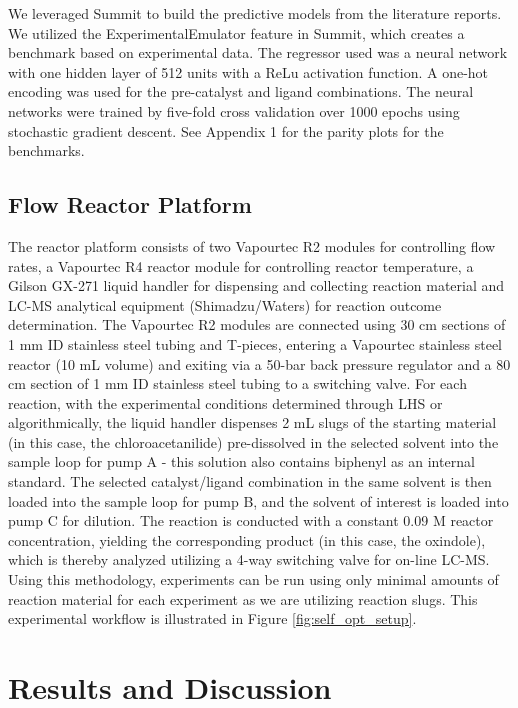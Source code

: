 We leveraged Summit to build the predictive models from the literature reports. We utilized the ExperimentalEmulator feature in Summit, which creates a benchmark based on experimental data. The regressor used was a neural network with one hidden layer of 512 units with a ReLu activation function. A one-hot encoding was used for the pre-catalyst and ligand combinations. The neural networks were trained by five-fold cross validation over 1000 epochs using stochastic gradient descent. See Appendix 1 for the parity plots for the benchmarks. 

\subsection{Flow Reactor Platform}

The reactor platform consists of two Vapourtec R2 modules for controlling flow rates, a Vapourtec R4 reactor module for controlling reactor temperature, a Gilson GX-271 liquid handler for dispensing and collecting reaction material and LC-MS analytical equipment (Shimadzu/Waters) for reaction outcome determination. The Vapourtec R2 modules are connected using 30 cm sections of 1 mm ID stainless steel tubing and T-pieces, entering a Vapourtec stainless steel reactor (10 mL volume) and exiting via a 50-bar back pressure regulator and a 80 cm section of 1 mm ID stainless steel tubing to a switching valve. For each reaction, with the experimental conditions determined through LHS or algorithmically, the liquid handler dispenses 2 mL slugs of the starting material (in this case, the chloroacetanilide) pre-dissolved in the selected solvent into the sample loop for pump A - this solution also contains biphenyl as an internal standard. The selected catalyst/ligand combination in the same solvent is then loaded into the sample loop for pump B, and the solvent of interest is loaded into pump C for dilution. The reaction is conducted with a constant 0.09 M reactor concentration, yielding the corresponding product (in this case, the oxindole), which is thereby analyzed utilizing a 4-way switching valve for on-line LC-MS. Using this methodology, experiments can be run using only minimal amounts of reaction material for each experiment as we are utilizing reaction slugs. This experimental workflow is illustrated in Figure \ref{fig:self_opt_setup}.

\section{Results and Discussion}

